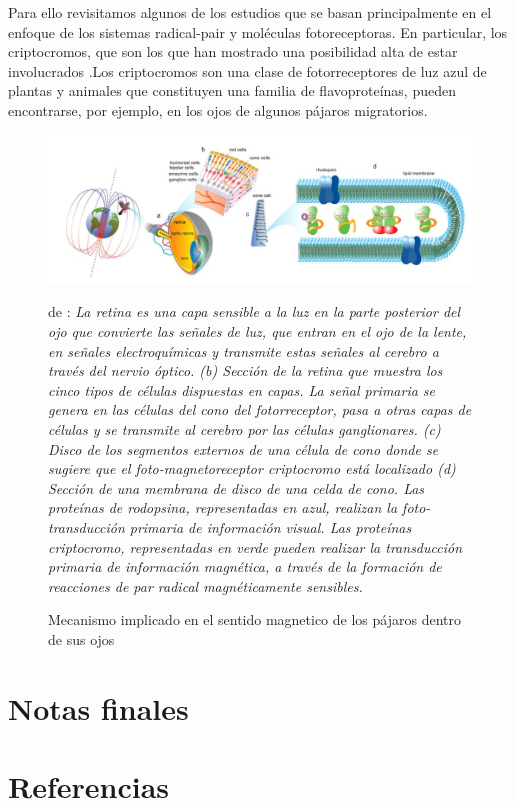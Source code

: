 \documentclass[1p]{elsarticle}
\begin{document}
Para ello revisitamos algunos de los estudios que se basan principalmente en el enfoque de los sistemas radical-pair y moléculas fotoreceptoras. En particular, los criptocromos, que son los que han mostrado una posibilidad alta de estar involucrados .Los criptocromos son una clase de fotorreceptores de luz azul de plantas y animales que constituyen una familia de flavoproteínas, pueden encontrarse, por ejemplo, en los ojos de algunos pájaros migratorios.




\begin{figure}
	\centering
	\includegraphics[width=1\textwidth]{ojos}
	\caption{Mecanismo implicado en el sentido magnetico de los pájaros dentro de sus ojos }
	\medskip
	\small
	de \cite{procopio2016inhomogeneous}: \textit{La retina es una capa sensible a la luz en la parte posterior del ojo que convierte las señales de luz, que entran en el ojo de la lente, en señales electroquímicas y transmite estas señales al cerebro a través del nervio óptico. (b) Sección de la retina que muestra los cinco tipos de células dispuestas en capas. La señal primaria se genera en las células del cono del fotorreceptor, pasa a otras capas de células y se transmite al cerebro por las células ganglionares. (c) Disco de los segmentos externos de una célula de cono donde se sugiere que el foto-magnetoreceptor criptocromo está localizado (d) Sección de una membrana de disco de una celda de cono. Las proteínas de rodopsina, representadas en azul, realizan la foto-transducción primaria de información visual. Las proteínas criptocromo, representadas en verde pueden realizar la transducción primaria de información magnética, a través de la formación de reacciones de par radical magnéticamente sensibles.}

\end{figure}




\section{Notas finales}


\section*{Referencias}


\end{document}
